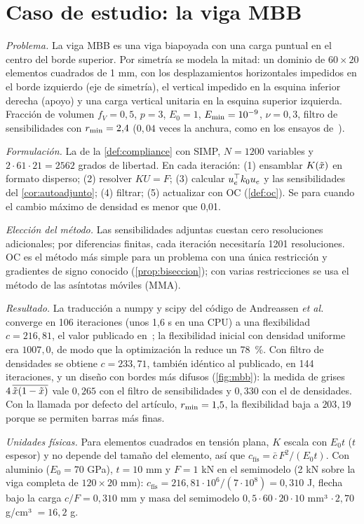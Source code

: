 \section{Caso de estudio: la viga MBB}

\begin{ejemplo}\label{ej:mbb}
\emph{Problema.} La viga MBB es una viga biapoyada con una carga puntual en el centro del borde superior. Por simetría se modela la mitad: un dominio de $60\times 20$ elementos cuadrados de 1 mm, con los desplazamientos horizontales impedidos en el borde izquierdo (eje de simetría), el vertical impedido en la esquina inferior derecha (apoyo) y una carga vertical unitaria en la esquina superior izquierda. Fracción de volumen $f_V=0{,}5$, $p=3$, $E_0=1$, $E_{\min}=10^{-9}$, $\nu=0{,}3$, filtro de sensibilidades con $r_{\min}=2{,}4$ ($0{,}04$ veces la anchura, como en los ensayos de~\cite[§3.4]{andreassen}).

\emph{Formulación.} La de la \cref{def:compliance} con SIMP, $N=1200$ variables y $2\cdot 61\cdot 21=2562$ grados de libertad. En cada iteración: (1) ensamblar $K(\tilde{x})$ en formato disperso; (2) resolver $KU=F$; (3) calcular $u_e^\top k_0u_e$ y las sensibilidades del \cref{cor:autoadjunto}; (4) filtrar; (5) actualizar con OC (\cref{def:oc}). Se para cuando el cambio máximo de densidad es menor que 0,01.

\emph{Elección del método.} Las sensibilidades adjuntas cuestan cero resoluciones adicionales; por diferencias finitas, cada iteración necesitaría 1201 resoluciones. OC es el método más simple para un problema con una única restricción y gradientes de signo conocido (\cref{prop:biseccion}); con varias restricciones se usa el método de las asíntotas móviles (MMA).

\emph{Resultado.} La traducción a numpy y scipy del código de Andreassen \emph{et al.} converge en 106 iteraciones (unos 1,6 s en una CPU) a una flexibilidad $c=216{,}81$, el valor publicado en~\cite[fig.~3]{andreassen}; la flexibilidad inicial con densidad uniforme era $1007{,}0$, de modo que la optimización la reduce un 78~\%. Con filtro de densidades se obtiene $c=233{,}71$, también idéntico al publicado, en 144 iteraciones, y un diseño con bordes más difusos (\cref{fig:mbb}): la medida de grises $4\,\overline{\tilde{x}(1-\tilde{x})}$ vale $0{,}265$ con el filtro de sensibilidades y $0{,}330$ con el de densidades. Con la llamada por defecto del artículo, $r_{\min}=1{,}5$, la flexibilidad baja a $203{,}19$ porque se permiten barras más finas.

\emph{Unidades físicas.} Para elementos cuadrados en tensión plana, $K$ escala con $E_0t$ ($t$ espesor) y no depende del tamaño del elemento, así que $c_{\text{fís}}=\bar c\,F^2/(E_0t)$. Con aluminio ($E_0=70$ GPa), $t=10$ mm y $F=1$ kN en el semimodelo (2 kN sobre la viga completa de $120\times 20$ mm): $c_{\text{fís}}=216{,}81\cdot 10^6/(7\cdot 10^{8})=0{,}310$ J, flecha bajo la carga $c/F=0{,}310$ mm y masa del semimodelo $0{,}5\cdot 60\cdot 20\cdot 10$ mm³ $\cdot\,2{,}70$ g/cm³ $=16{,}2$ g.
\end{ejemplo}

